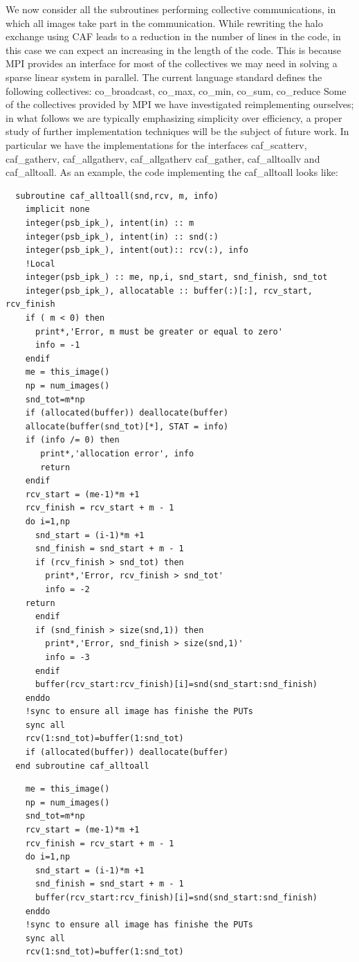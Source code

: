 \documentclass{IOS-Book-Article}
\begin{document}
We now consider all the subroutines performing collective
communications, in which all images take part in the
communication. While rewriting the halo exchange using CAF leads to a
reduction in the number of lines in the code, in this case we can
expect an increasing in the length of the code. This is because MPI
provides an interface for most of the collectives we may need in
solving a sparse linear system in parallel.
The current language standard defines the following collectives: co\_broadcast, co\_max, co\_min, co\_sum, co\_reduce
Some of the collectives provided by MPI  we have investigated
reimplementing ourselves; in what follows we are typically emphasizing
simplicity over efficiency, a proper study of further implementation
techniques will be the subject of future work. In particular 
we have the implementations for the interfaces caf\_scatterv,
caf\_gatherv, caf\_allgatherv, caf\_allgatherv caf\_gather,
caf\_alltoallv and caf\_alltoall.  
As an example, the code implementing the caf\_alltoall looks like:
\lstset{language=Fortran} 
\iffalse
{\small
\begin{lstlisting}
  subroutine caf_alltoall(snd,rcv, m, info)
    implicit none
    integer(psb_ipk_), intent(in) :: m
    integer(psb_ipk_), intent(in) :: snd(:)
    integer(psb_ipk_), intent(out):: rcv(:), info
    !Local
    integer(psb_ipk_) :: me, np,i, snd_start, snd_finish, snd_tot
    integer(psb_ipk_), allocatable :: buffer(:)[:], rcv_start, rcv_finish
    if ( m < 0) then
      print*,'Error, m must be greater or equal to zero'
      info = -1
    endif
    me = this_image()
    np = num_images()
    snd_tot=m*np
    if (allocated(buffer)) deallocate(buffer)
    allocate(buffer(snd_tot)[*], STAT = info)
    if (info /= 0) then
       print*,'allocation error', info
       return
    endif
    rcv_start = (me-1)*m +1
    rcv_finish = rcv_start + m - 1
    do i=1,np
      snd_start = (i-1)*m +1 
      snd_finish = snd_start + m - 1
      if (rcv_finish > snd_tot) then
        print*,'Error, rcv_finish > snd_tot'
        info = -2 
	return
      endif
      if (snd_finish > size(snd,1)) then
        print*,'Error, snd_finish > size(snd,1)'
        info = -3 
      endif
      buffer(rcv_start:rcv_finish)[i]=snd(snd_start:snd_finish)
    enddo
    !sync to ensure all image has finishe the PUTs 
    sync all
    rcv(1:snd_tot)=buffer(1:snd_tot)
    if (allocated(buffer)) deallocate(buffer)
  end subroutine caf_alltoall
\end{lstlisting}}
\else
{\small
\begin{lstlisting}
    me = this_image()
    np = num_images()
    snd_tot=m*np
    rcv_start = (me-1)*m +1
    rcv_finish = rcv_start + m - 1
    do i=1,np
      snd_start = (i-1)*m +1 
      snd_finish = snd_start + m - 1
      buffer(rcv_start:rcv_finish)[i]=snd(snd_start:snd_finish)
    enddo
    !sync to ensure all image has finishe the PUTs 
    sync all
    rcv(1:snd_tot)=buffer(1:snd_tot)
\end{lstlisting}}
\end{document}
